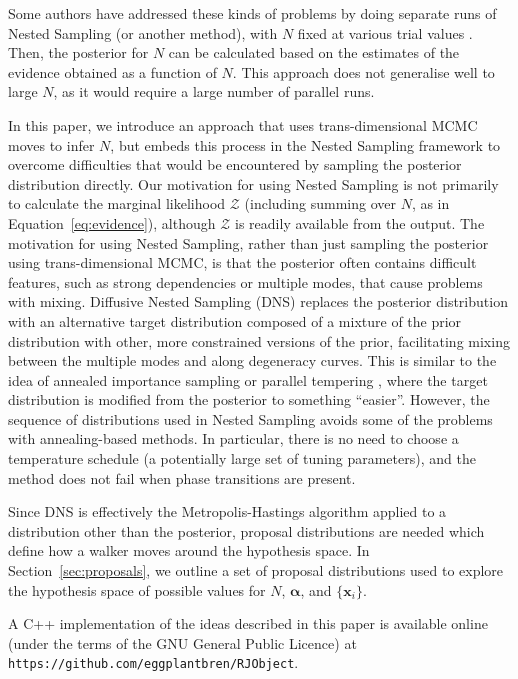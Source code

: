 \documentclass[letterpaper, 11pt]{article}
\newcommand{\hyperparams}{\boldsymbol{\alpha}}
\newcommand{\xx}{\mathbf{x}}
\begin{document}
Some authors have addressed these kinds of problems by
doing separate runs of Nested Sampling
(or another method),
with $N$ fixed at various trial values \citep[e.g.][]{fengji, feroz}.
Then, the posterior for $N$ can be calculated
based on the estimates of the evidence obtained as a function of $N$.
This approach does not generalise well to large $N$, as it would
require a large number of parallel runs.

In this paper, we introduce an approach that uses trans-dimensional MCMC moves
to infer $N$, but embeds this process in the Nested Sampling framework to
overcome difficulties that would be encountered by sampling the posterior
distribution directly. Our motivation
for using Nested Sampling is not primarily to calculate the marginal
likelihood $\mathcal{Z}$ (including summing over $N$, as in
Equation~\ref{eq:evidence}),
although $\mathcal{Z}$ is readily available from the output.
The motivation for using Nested Sampling, rather than just sampling the
posterior using trans-dimensional MCMC, is that the posterior often contains
difficult features, such as strong dependencies or multiple modes, that cause
problems with mixing. Diffusive Nested Sampling
(DNS) replaces the posterior distribution with an alternative target
distribution composed of a mixture of the prior distribution with other, more
constrained versions of the prior, facilitating mixing between the multiple modes
and along degeneracy curves.
This is similar to the idea of annealed importance sampling
\citep{neal} or parallel tempering \citep{pt},
where the target distribution is modified from the posterior to something
``easier''. However,
the sequence of distributions used in Nested Sampling avoids some of the
problems with annealing-based methods. In particular, there is no need to choose
a temperature schedule (a potentially large set of tuning parameters),
and the method does not fail when phase transitions
are present.

Since DNS is effectively the Metropolis-Hastings algorithm applied to a
distribution other than the posterior, proposal distributions are needed
which define how a walker moves around the hypothesis space.
In Section~\ref{sec:proposals}, we outline a set of proposal distributions used
to explore the hypothesis space of possible values for $N$, $\hyperparams$,
and $\{\xx_i\}$.

A C++ implementation of the ideas described in this paper is available online
(under the terms of the GNU General Public Licence) at
{\tt https://github.com/eggplantbren/RJObject}.
\end{document}
